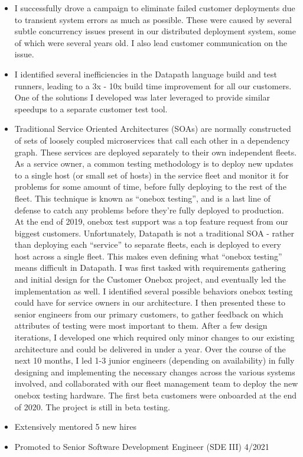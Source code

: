 \documentclass{res}
\begin{document}
\begin{resume}
\begin{itemize}
   \item I successfully drove a campaign to eliminate failed customer deployments due to transient system errors as much as possible.  These were caused by several subtle concurrency issues present in our distributed deployment system, some of which were several years old.  I also lead customer communication on the issue.
   \item I identified several inefficiencies in the Datapath language build and test runners, leading to a 3x - 10x build time improvement for all our customers.  One of the solutions I developed was later leveraged to provide similar speedups to a separate customer test tool.
   \item Traditional Service Oriented Architectures (SOAs) are normally constructed of sets of loosely coupled microservices that call each other in a dependency graph.  These services are deployed separately to their own independent fleets.  As a service owner, a common testing methodology is to deploy new updates to a single host (or small set of hosts) in the service fleet and monitor it for problems for some amount of time, before fully deploying to the rest of the fleet.  This technique is known as “onebox testing”, and is a last line of defense to catch any problems before they’re fully deployed to production.\\
At the end of 2019, onebox test support was a top feature request from our biggest customers.  Unfortunately, Datapath is not a traditional SOA - rather than deploying each “service” to separate fleets, each is deployed to every host across a single fleet.  This makes even defining what “onebox testing” means difficult in Datapath.
I was first tasked with requirements gathering and initial design for the Customer Onebox project, and eventually led the implementation as well.  I identified several possible behaviors onebox testing could have for service owners in our architecture.  I then presented these to senior engineers from our primary customers, to gather feedback on which attributes of testing were most important to them.  After a few design iterations, I developed one which required only minor changes to our existing architecture and could be delivered in under a year.  Over the course of the next 10 months, I led 1-3 junior engineers (depending on availability) in fully designing and implementing the necessary changes across the various systems involved, and collaborated with our fleet management team to deploy the new onebox testing hardware.  The first beta customers were onboarded at the end of 2020.  The project is still in beta testing.
   \item Extensively mentored 5 new hires
   \item Promoted to Senior Software Development Engineer (SDE III) 4/2021
   \end{itemize}


\end{resume}
\end{document}
